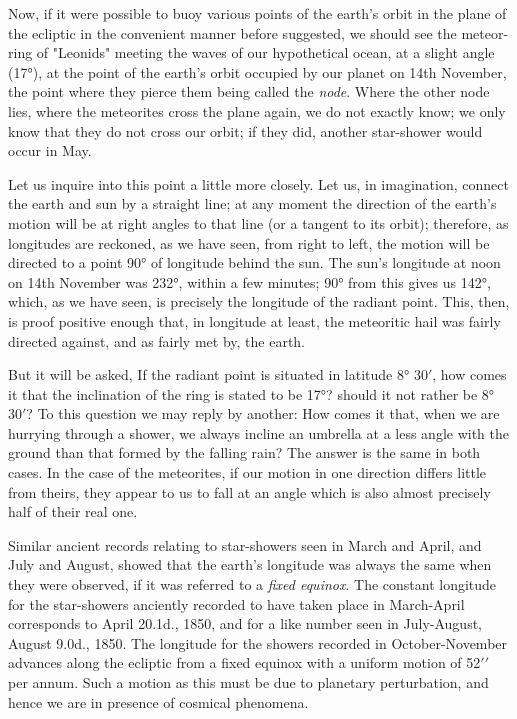 \documentclass[a4paper, 12pt, oneside, polutonikogreek, english]{article}
\begin{document}
Now, if it were possible to buoy various points of the earth's orbit in the plane of the ecliptic in the convenient manner before suggested, we should see the meteor-ring of "Leonids" meeting the waves of our hypothetical ocean, at a slight angle (17°), at the point of the earth's orbit occupied by our planet on 14th November, the point where they pierce them being called the \emph{node}. Where the other node lies, where the meteorites cross the plane again, we do not exactly know; we only know that they do not cross our orbit; if they did, another star-shower would occur in May.

Let us inquire into this point a little more closely. Let us, in imagination, connect the earth and sun by a straight line; at any moment the direction of the earth's motion will be at right angles to that line (or a tangent to its orbit); therefore, as longitudes are reckoned, as we have seen, from right to left, the motion will be directed to a point 90° of longitude behind the sun. The sun's longitude at noon on 14th November was 232°, within a few minutes; 90° from this gives us 142°, which, as we have seen, is precisely the longitude of the radiant point. This, then, is proof positive enough that, in longitude at least, the meteoritic hail was fairly directed against, and as fairly met by, the earth.

But it will be asked, If the radiant point is situated in latitude 8° 30$\prime$, how comes it that the inclination of the ring is stated to be 17°? should it not rather be 8° 30$\prime$? To this question we may reply by another: How comes it that, when we are hurrying through a shower, we always incline an umbrella at a less angle with the ground than that formed by the falling rain? The answer is the same in both cases. In the case of the meteorites, if our motion in one direction differs little from theirs, they appear to us to fall at an angle which is also almost precisely half of their real one.

Similar ancient records relating to star-showers seen in March and April, and July and August, showed that the earth's longitude was always the same when they were observed, if it was referred to a \emph{fixed equinox}. The constant longitude for the star-showers anciently recorded to have taken place in March-April corresponds to April 20.1d., 1850, and for a like number seen in July-August, August 9.0d., 1850. The longitude for the showers recorded in October-November advances along the ecliptic from a fixed equinox with a uniform motion of 52$\prime\prime$ per annum. Such a motion as this must be due to planetary perturbation, and hence we are in presence of cosmical phenomena.
\end{document}
